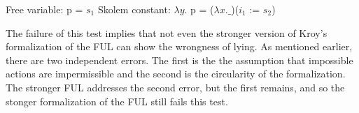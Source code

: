 \begin{isabellebody}
{  Free variable:
    p = $s_1$
   Skolem constant:
    $\lambda y$. p = ($\lambda x. \_$)($i_1$ := $s_2$)
\color{black}%
}%
\endisatagproof
{\isafoldproof}%
%
\isadelimproof
%
\endisadelimproof
%
\begin{isamarkuptext}%
The failure of this test implies that not even the stronger version of Kroy's formalization
        of the FUL can show the wrongness of lying. As mentioned earlier, there are two independent errors. The first is the 
        the assumption that impossible actions are impermissible and the second is the circularity of the 
        formalization. The stronger FUL addresses the second error, but the first remains, and so the
        stonger formalization of the FUL still fails this test.

        \newpage%
\end{isamarkuptext}\isamarkuptrue%
%
\isadelimtheory
%
\endisadelimtheory
%
\isatagtheory
%
\endisatagtheory
{\isafoldtheory}%
%
\isadelimtheory
%
\endisadelimtheory
%
\end{isabellebody}%
\endinput
